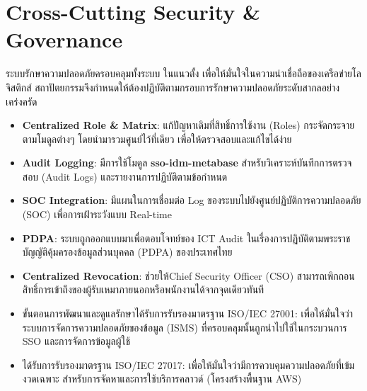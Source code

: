 \newpage\sloppy
\section{Cross-Cutting Security \& Governance}
ระบบรักษาความปลอดภัยครอบคลุมทั้งระบบ ในแนวตั้ง เพื่อให้มั่นใจในความน่าเชื่อถือของเครือข่ายโลจิสติกส์ สถาปัตยกรรมจึงกำหนดให้ต้องปฏิบัติตามกรอบการรักษาความปลอดภัยระดับสากลอย่างเคร่งครัด\par

\begin{itemize}
	\item \textbf{Centralized Role \& Matrix}: แก้ปัญหาเดิมที่สิทธิ์การใช้งาน (Roles) กระจัดกระจายตามโมดูลต่างๆ โดยนำมารวมศูนย์ไว้ที่เดียว เพื่อให้ตรวจสอบและแก้ไขได้ง่าย\par
	\item \textbf{Audit Logging}: มีการใช้โมดูล \textbf{sso-idm-metabase} สำหรับวิเคราะห์บันทึกการตรวจสอบ (Audit Logs) และรายงานการปฏิบัติตามข้อกำหนด\par
	\item \textbf{SOC Integration}: มีแผนในการเชื่อมต่อ Log ของระบบไปยังศูนย์ปฏิบัติการความปลอดภัย (SOC) เพื่อการเฝ้าระวังแบบ Real-time\par
	\item \textbf{PDPA}: ระบบถูกออกแบบมาเพื่อตอบโจทย์ของ ICT Audit ในเรื่องการปฏิบัติตามพระราชบัญญัติคุ้มครองข้อมูลส่วนบุคคล (PDPA) ของประเทศไทย\par
	\item \textbf{Centralized Revocation}: ช่วยให้Chief Security Officer (CSO) สามารถเพิกถอนสิทธิ์การเข้าถึงของผู้รับเหมาภายนอกหรือพนักงานได้จากจุดเดียวทันที\par
\end{itemize}

\begin{itemize}
	\item ขั้นตอนการพัฒนาและดูแลรักษาได้รับการรับรองมาตรฐาน ISO/IEC 27001: เพื่อให้มั่นใจว่าระบบการจัดการความปลอดภัยของข้อมูล (ISMS) ที่ครอบคลุมนั้นถูกนำไปใช้ในกระบวนการ SSO และการจัดการข้อมูลผู้ใช้
	\item ได้รับการรับรองมาตรฐาน ISO/IEC 27017: เพื่อให้มั่นใจว่ามีการควบคุมความปลอดภัยที่เข้มงวดเฉพาะ สำหรับการจัดหาและการใช้บริการคลาวด์ (โครงสร้างพื้นฐาน AWS)
\end{itemize}
\fussy
